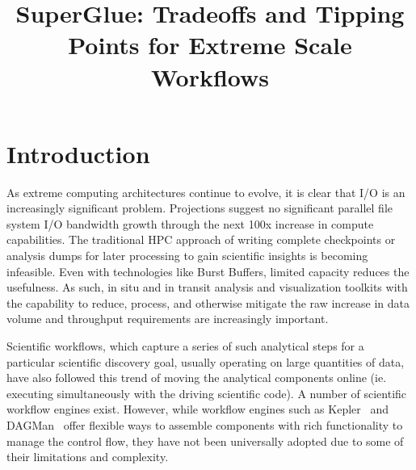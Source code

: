 \documentclass[conference]{IEEEtran}
\begin{document}
\title{SuperGlue: Tradeoffs and Tipping Points for Extreme Scale Workflows}

\author{
}

\maketitle





\section{Introduction}
\label{s:intro}

As extreme computing architectures continue to evolve, it is 
clear that I/O is an increasingly significant problem.  Projections suggest no
significant parallel file system I/O bandwidth growth through the next 100x
increase in compute capabilities.  The traditional HPC approach of writing
complete checkpoints or analysis dumps for later processing to gain scientific
insights is becoming infeasible.  Even with technologies like Burst Buffers,
limited capacity reduces the usefulness. As such, in situ and in transit
analysis and visualization toolkits with the capability to reduce, process, and
otherwise mitigate the raw increase in data volume and throughput requirements
are increasingly important.


Scientific workflows, which 
capture a series of such analytical steps for a
particular scientific discovery goal, usually
operating on large quantities of data,
have also followed this trend of moving the analytical components
online (ie. executing simultaneously with the driving scientific code).
A number of scientific workflow engines exist.
However, while workflow engines such as
Kepler~\cite{bertram:2006:kepler} and
DAGMan~\cite{Malewicz:2006:dagman}
offer flexible ways to assemble components
with rich functionality to manage the control flow, they have not been
universally adopted due to some of their limitations and complexity.
\end{document}
